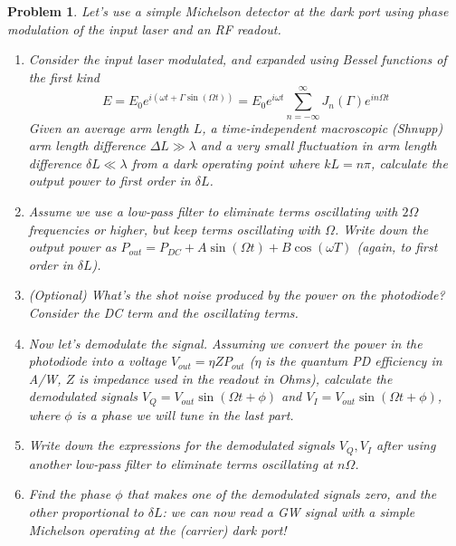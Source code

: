 \documentclass{article}
\newtheorem{plm}{Problem}
\begin{document}
\begin{plm}
  Let's use a simple Michelson detector at the dark port using phase modulation of the input laser and an RF readout.
  \begin{enumerate}
  \item Consider the input laser modulated, and expanded using Bessel functions of the first kind
    \[
      E = E_{0}e^{i(\omega t + \Gamma \sin(\Omega t))} = E_{0}e^{i\omega t}\sum_{n = -\infty}^{\infty}J_{n}(\Gamma)e^{in\Omega t}
    \]
    Given an average arm length $L$, a time-independent macroscopic (Shnupp) arm length difference $\Delta L \gg \lambda$
    and a very small fluctuation in arm length difference $\delta L \ll \lambda$ from a dark operating point where $kL = n\pi$,
    calculate the output power to first order in $\delta L$.
  \item Assume we use a low-pass filter to eliminate terms oscillating with $2\Omega$ frequencies or higher,
    but keep terms oscillating with $\Omega$.
    Write down the output power as $P_{out} = P_{DC} + A\sin(\Omega t) + B\cos(\omega T)$ (again, to first order in $\delta L$).
  \item (Optional) What's the shot noise produced by the power on the photodiode?
    Consider the DC term and the oscillating terms.
  \item Now let's demodulate the signal.
    Assuming we convert the power in the photodiode into a voltage $V_{out} = \eta ZP_{out}$
    ($\eta$ is the quantum PD efficiency in \si{A/W}, $Z$ is impedance used in the readout in Ohms),
    calculate the demodulated signals $V_{Q} = V_{out}\sin(\Omega t + \phi)$ and $V_{I} = V_{out}\sin(\Omega t + \phi)$,
    where $\phi$ is a phase we will tune in the last part.
  \item Write down the expressions for the demodulated signals $V_{Q}, V_{I}$ after using another low-pass filter to eliminate terms
    oscillating at $n\Omega$.
  \item Find the phase $\phi$ that makes one of the demodulated signals zero, and the other proportional to $\delta L$:
    we can now read a GW signal with a simple Michelson operating at the (carrier) dark port!
  \end{enumerate}
\end{plm}
\end{document}
